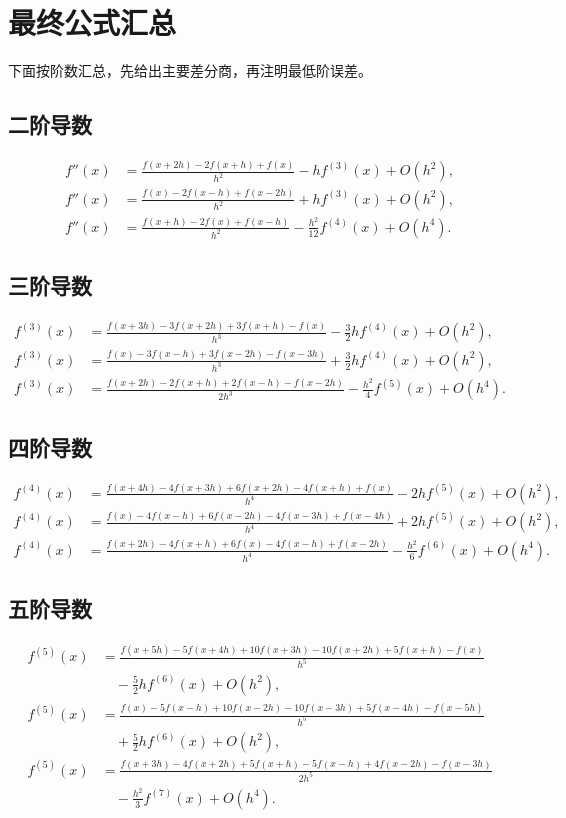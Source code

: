 \documentclass[12pt,a4paper]{ctexart}
\begin{document}
\section{最终公式汇总}
下面按阶数汇总，先给出主要差分商，再注明最低阶误差。

\subsection*{二阶导数}
\[
\begin{aligned}
f''(x)&=\frac{f(x+2h)-2f(x+h)+f(x)}{h^2}-h f^{(3)}(x)+O(h^2),\\
f''(x)&=\frac{f(x)-2f(x-h)+f(x-2h)}{h^2}+h f^{(3)}(x)+O(h^2),\\
f''(x)&=\frac{f(x+h)-2f(x)+f(x-h)}{h^2}-\frac{h^2}{12}f^{(4)}(x)+O(h^4).
\end{aligned}
\]

\subsection*{三阶导数}
\[
\begin{aligned}
f^{(3)}(x)&=\frac{f(x+3h)-3f(x+2h)+3f(x+h)-f(x)}{h^3}-\frac32h f^{(4)}(x)+O(h^2),\\
f^{(3)}(x)&=\frac{f(x)-3f(x-h)+3f(x-2h)-f(x-3h)}{h^3}+\frac32h f^{(4)}(x)+O(h^2),\\
f^{(3)}(x)&=\frac{f(x+2h)-2f(x+h)+2f(x-h)-f(x-2h)}{2h^3}-\frac{h^2}{4}f^{(5)}(x)+O(h^4).
\end{aligned}
\]

\subsection*{四阶导数}
\[
\begin{aligned}
f^{(4)}(x)&=\frac{f(x+4h)-4f(x+3h)+6f(x+2h)-4f(x+h)+f(x)}{h^4}-2h f^{(5)}(x)+O(h^2),\\
f^{(4)}(x)&=\frac{f(x)-4f(x-h)+6f(x-2h)-4f(x-3h)+f(x-4h)}{h^4}+2h f^{(5)}(x)+O(h^2),\\
f^{(4)}(x)&=\frac{f(x+2h)-4f(x+h)+6f(x)-4f(x-h)+f(x-2h)}{h^4}-\frac{h^2}{6}f^{(6)}(x)+O(h^4).
\end{aligned}
\]

\subsection*{五阶导数}
\[
\begin{aligned}
f^{(5)}(x)&=\frac{f(x+5h)-5f(x+4h)+10f(x+3h)-10f(x+2h)+5f(x+h)-f(x)}{h^5}\\
&\quad -\frac52h f^{(6)}(x)+O(h^2),\\[0.4em]
f^{(5)}(x)&=\frac{f(x)-5f(x-h)+10f(x-2h)-10f(x-3h)+5f(x-4h)-f(x-5h)}{h^5}\\
&\quad +\frac52h f^{(6)}(x)+O(h^2),\\[0.4em]
f^{(5)}(x)&=\frac{f(x+3h)-4f(x+2h)+5f(x+h)-5f(x-h)+4f(x-2h)-f(x-3h)}{2h^5}\\
&\quad -\frac{h^2}{3}f^{(7)}(x)+O(h^4).
\end{aligned}
\]
\end{document}
